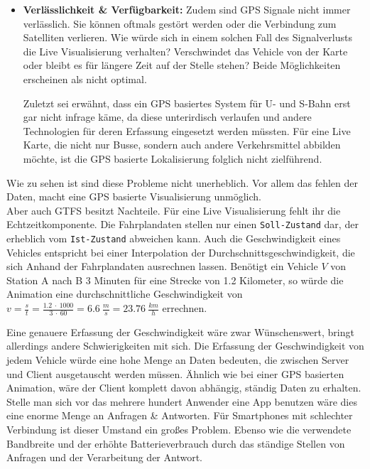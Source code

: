\begin{itemize}[label={}]
      \item \textbf{Verlässlichkeit \& Verfügbarkeit:} 
        Zudem sind GPS Signale nicht immer verlässlich. Sie können oftmals gestört werden oder die Verbindung zum Satelliten verlieren. Wie würde sich in einem solchen Fall des Signalverlusts die Live Visualisierung verhalten? Verschwindet das Vehicle von der Karte oder bleibt es für längere Zeit auf der Stelle stehen? Beide Möglichkeiten erscheinen als nicht optimal. 

        Zuletzt sei erwähnt, dass ein GPS basiertes System für U- und S-Bahn erst gar nicht infrage käme, da diese unterirdisch verlaufen und andere Technologien für deren Erfassung eingesetzt werden müssten. Für eine Live Karte, die nicht nur Busse, sondern auch andere Verkehrsmittel abbilden möchte, ist die GPS basierte Lokalisierung folglich nicht zielführend.
    \end{itemize} 

    Wie zu sehen ist sind diese Probleme nicht unerheblich. Vor allem das fehlen der Daten, macht eine GPS basierte Visualisierung unmöglich.\\

    Aber auch GTFS besitzt Nachteile. Für eine Live Visualisierung fehlt ihr die Echtzeitkomponente. Die Fahrplandaten stellen nur einen \texttt{Soll-Zustand} dar, der erheblich vom \texttt{Ist-Zustand} abweichen kann. Auch die Geschwindigkeit eines Vehicles entspricht bei einer Interpolation der Durchschnittsgeschwindigkeit, die sich Anhand der Fahrplandaten ausrechnen lassen. Benötigt ein Vehicle $V$ von Station A nach B 3 Minuten für eine Strecke von 1.2 Kilometer, so würde die Animation eine durchschnittliche Geschwindigkeit von $v = \frac{s}{t} = \frac{1.2 \: \cdot \: 1000}{3 \: \cdot \: 60} = 6.6 \: \frac{m}{s} = 23.76 \: \frac{km}{h}$ errechnen.


    Eine genauere Erfassung der Geschwindigkeit wäre zwar Wünschenswert, bringt allerdings andere Schwierigkeiten mit sich. Die Erfassung der Geschwindigkeit von jedem Vehicle würde eine hohe Menge an Daten bedeuten, die zwischen Server und Client ausgetauscht werden müssen. Ähnlich wie bei einer GPS basierten Animation, wäre der Client komplett davon abhängig, ständig Daten zu erhalten. Stelle man sich vor das mehrere hundert Anwender eine App benutzen wäre dies eine enorme Menge an Anfragen \& Antworten. Für Smartphones mit schlechter Verbindung ist dieser Umstand ein großes Problem. Ebenso wie die verwendete Bandbreite und der erhöhte Batterieverbrauch durch das ständige Stellen von Anfragen und der Verarbeitung der Antwort.

